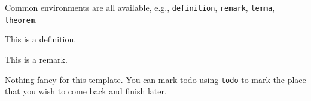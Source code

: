 \documentclass[12pt]{article}
\author{Pingbang Hu}
\begin{document}
\clearpage\maketitle
\thispagestyle{empty}

\newpage
\setcounter{page}{1}
Common environments are all available, e.g., \texttt{definition}, \texttt{remark}, \texttt{lemma}, \texttt{theorem}.

\begin{definition}
	This is a definition.
\end{definition}

\begin{remark}
	This is a remark.
\end{remark}

Nothing fancy for this template. You can mark todo using \texttt{todo} to mark the place that you wish to come back and finish later.
\end{document}
